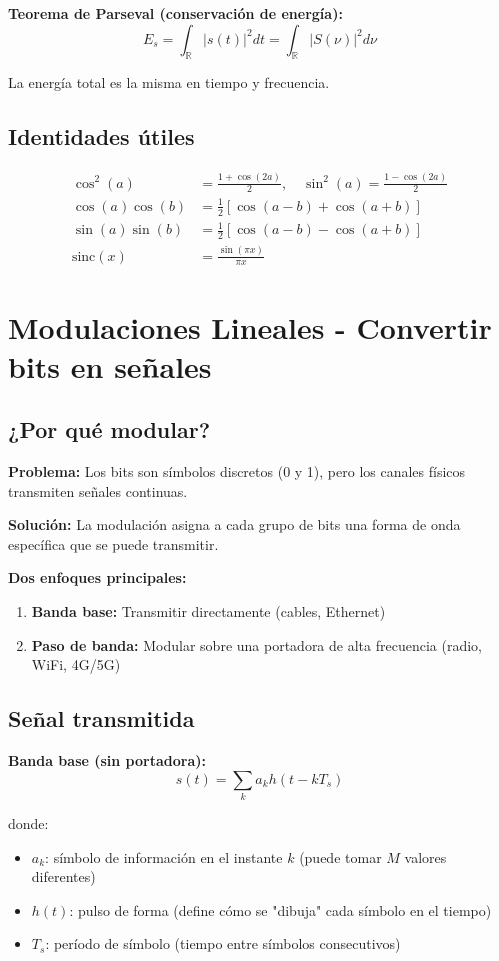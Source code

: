\documentclass[10pt,a4paper]{article}
\begin{document}
\textbf{Teorema de Parseval (conservación de energía):}
$$E_s = \int_{\mathbb{R}} |s(t)|^2dt = \int_{\mathbb{R}} |S(\nu)|^2d\nu$$

La energía total es la misma en tiempo y frecuencia.

\subsection{Identidades útiles}

\begin{align*}
\cos^2(a) &= \frac{1 + \cos(2a)}{2}, \quad \sin^2(a) = \frac{1 - \cos(2a)}{2}\\
\cos(a)\cos(b) &= \frac{1}{2}[\cos(a-b) + \cos(a+b)]\\
\sin(a)\sin(b) &= \frac{1}{2}[\cos(a-b) - \cos(a+b)]\\
\text{sinc}(x) &= \frac{\sin(\pi x)}{\pi x}
\end{align*}

\section{Modulaciones Lineales - Convertir bits en señales}

\subsection{¿Por qué modular?}

\textbf{Problema:} Los bits son símbolos discretos (0 y 1), pero los canales físicos transmiten señales continuas.

\textbf{Solución:} La modulación asigna a cada grupo de bits una forma de onda específica que se puede transmitir.

\textbf{Dos enfoques principales:}
\begin{enumerate}
\item \textbf{Banda base:} Transmitir directamente (cables, Ethernet)
\item \textbf{Paso de banda:} Modular sobre una portadora de alta frecuencia (radio, WiFi, 4G/5G)
\end{enumerate}

\subsection{Señal transmitida}

\textbf{Banda base (sin portadora):}
$$s(t) = \sum_{k} a_k h(t-kT_s)$$

donde:
\begin{itemize}
\item $a_k$: símbolo de información en el instante $k$ (puede tomar $M$ valores diferentes)
\item $h(t)$: pulso de forma (define cómo se "dibuja" cada símbolo en el tiempo)
\item $T_s$: período de símbolo (tiempo entre símbolos consecutivos)
\end{itemize}
\end{document}
